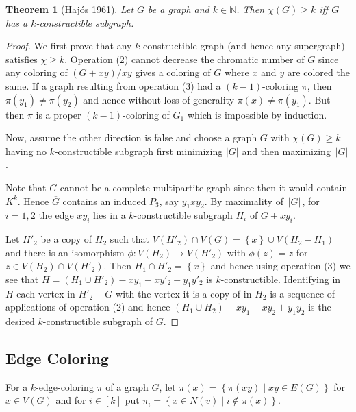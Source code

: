 \documentclass[12pt]{article}
\theoremstyle{plain}
\newtheorem{thm}{Theorem}
\theoremstyle{definition}
\theoremstyle{remark}
\newcommand{\set}[1]{\left\{ #1 \right\}}
\newcommand{\setb}[3]{\left\{ #1 \in #2 \mid #3 \right\}}
\newcommand{\setbs}[2]{\left\{ #1 \mid #2 \right\}}
\newcommand{\card}[1]{\left|#1\right|}
\newcommand{\size}[1]{\left\Vert#1\right\Vert}
\newcommand{\func}[3]{#1\colon #2 \rightarrow #3}
\newcommand{\irange}[1]{\left[#1\right]}
\begin{document}
\begin{thm}[Haj{\'o}s 1961]
Let $G$ be a graph and $k \in \mathbb{N}$.  Then $\chi(G) \geq k$ iff $G$ has a $k$-constructible subgraph.
\end{thm}
\begin{proof}
We first prove that any $k$-constructible graph (and hence any supergraph) satisfies $\chi \geq k$.  Operation (2) cannot decrease the chromatic number of $G$ since any coloring of $(G + xy) / xy$ gives a coloring of $G$ where $x$ and $y$ are colored the same.  If a graph resulting from operation (3) had a $(k-1)$-coloring $\pi$, then $\pi(y_1) \neq \pi(y_2)$ and hence without loss of generality $\pi(x) \neq \pi(y_1)$.  But then $\pi$ is a proper $(k-1)$-coloring of $G_1$ which is impossible by induction.

Now, assume the other direction is false and choose a graph $G$ with $\chi(G) \geq k$ having no $k$-constructible subgraph first minimizing $\card{G}$ and then maximizing $\size{G}$.  

Note that $G$ cannot be a complete multipartite graph since then it would contain $K^k$.  Hence $\overline{G}$ contains an induced $P_3$, say $y_1xy_2$.  By maximality of $\size{G}$, for $i = 1, 2$ the edge $xy_i$ lies in a $k$-constructible subgraph $H_i$ of $G + xy_i$.

Let $H'_2$ be a copy of $H_2$ such that $V(H'_2) \cap V(G) = \set{x} \cup V(H_2 - H_1)$ and there is an isomorphism $\func{\phi}{V(H_2)}{V(H'_2)}$ with $\phi(z) = z$ for $z \in V(H_2) \cap V(H'_2)$.  Then $H_1 \cap H'_2 = \set{x}$ and hence using operation (3) we see that $H = (H_1 \cup H'_2) - xy_1 - xy'_2 + y_1y'_2$ is $k$-constructible.  Identifying in $H$ each vertex in $H'_2 - G$ with the vertex it is a copy of in $H_2$ is a sequence of applications of operation (2) and hence $(H_1 \cup H_2) - xy_1 - xy_2 + y_1y_2$ is the desired $k$-constructible subgraph of $G$.

\end{proof}

\subsection{Edge Coloring}
For a $k$-edge-coloring $\pi$ of a graph $G$, let $\pi(x) = \setbs{\pi(xy)}{xy \in E(G)}$ for $x \in V(G)$ and for $i \in \irange{k}$ put $\pi_i = \setb{x}{N(v)}{i \not \in \pi(x)}$.
\end{document}

